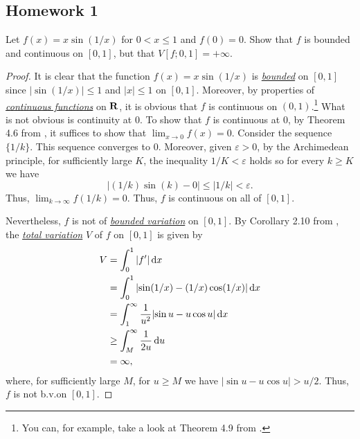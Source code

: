 \subsection{Homework 1}
\begin{problem}
Let $f(x)=x\sin(1/x)$ for $0<x\leq 1$ and $f(0)=0$. Show that $f$ is
bounded and continuous on $[0,1]$, but that $V[f;0,1]=+\infty$.
\end{problem}
\begin{proof}
  It is clear that the function $f(x)=x\sin(1/x)$ is
  \href{https://en.wikipedia.org/wiki/Bounded_function}{\emph{bounded}} on
  $[0,1]$ since $|{\sin(1/x)}|\leq 1$ and $|x|\leq 1$ on $[0,1]$. Moreover,
  by properties of
  \href{https://en.wikipedia.org/wiki/Continuous_function#Weierstrass_definition_.28epsilon.E2.80.93delta.29_of_continuous_functions}{\emph{continuous
      functions}} on $\mathbf{R}$, it is obvious that $f$ is continuous on
  $(0,1)$.\footnote{You can, for example, take a look at Theorem 4.9 from
    \cite[Ch.\@ 4, p.\@ 87]{rudin-1}.} What is not obvious is continuity at
  $0$. To show that $f$ is continuous at $0$, by Theorem 4.6 from
  \cite[Ch.\@ 4, p.\@ 86]{rudin-1}, it suffices to show that
  $\lim_{x\to 0}f(x)=0$. Consider the sequence $\{1/k\}$. This sequence
  converges to $0$. Moreover, given $\varepsilon>0$, by the Archimedean
  principle, for sufficiently large $K$, the inequality $1/K<\varepsilon$
  holds so for every $k\geq K$ we have
\begin{equation}
\label{eq:1:1}
|{(1/k)\sin(k)-0}|\leq
|1/k|<\varepsilon.
\end{equation}
Thus, $\lim_{k\to\infty}f(1/k)=0$. Thus, $f$ is continuous on all of
$[0,1]$.

Nevertheless, $f$ is not of
\href{https://en.wikipedia.org/wiki/Bounded_variation}{\emph{bounded
    variation}} on $[0,1]$. By Corollary 2.10 from \cite[Ch.\@ 2, p.\@
23]{wheeden-zygmund}, the
\href{https://en.wikipedia.org/wiki/Total_variation}{\emph{total
    variation}} $V$ of $f$ on $[0,1]$ is given by
\begin{equation}
\label{eq:1:2}
\begin{aligned}
V&=\int_0^1|f'|\mathop{}\!\mathrm{d} x\\
&=\int_0^1|{\sin(1/x)-(1/x)\cos(1/x)}|\mathop{}\!\mathrm{d} x\\
&=\int_1^\infty\frac{1}{u^2}|{\sin u-u\cos u}|\mathop{}\!\mathrm{d} x\\
&\geq\int_M^\infty \frac{1}{2u}\mathop{}\!\mathrm{d} u\\
&=\infty,
\end{aligned}
\end{equation}
where, for sufficiently large $M$, for $u\geq M$ we have $|{\sin u- u\cos
  u}|>u/2$. Thus, $f$ is not b.v.\@ on $[0,1]$.
\end{proof}


